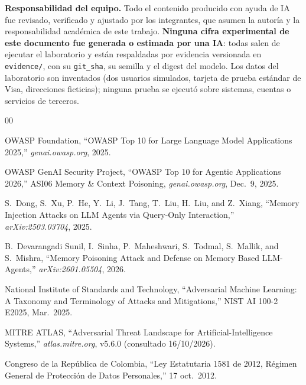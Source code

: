 \documentclass[conference]{IEEEtran}
\begin{document}
\textbf{Responsabilidad del equipo.} Todo el contenido producido con ayuda de
IA fue revisado, verificado y ajustado por los integrantes, que asumen la
autor\'ia y la responsabilidad acad\'emica de este trabajo.
\textbf{Ninguna cifra experimental de este documento fue generada o
estimada por una IA}: todas salen de ejecutar el laboratorio y est\'an
respaldadas por evidencia versionada en \texttt{evidence/}, con su
\texttt{git\_sha}, su semilla y el digest del modelo. Los datos del
laboratorio son inventados (dos usuarios simulados, tarjeta de prueba
est\'andar de Visa, direcciones ficticias); ninguna prueba se ejecut\'o
sobre sistemas, cuentas o servicios de terceros.

\begin{thebibliography}{00}

OWASP Foundation, ``OWASP Top 10 for Large Language Model Applications
2025,'' \emph{genai.owasp.org}, 2025.

OWASP GenAI Security Project, ``OWASP Top 10 for Agentic Applications
2026,'' ASI06 Memory \& Context Poisoning, \emph{genai.owasp.org}, Dec.\ 9,
2025.

S.\ Dong, S.\ Xu, P.\ He, Y.\ Li, J.\ Tang, T.\ Liu, H.\ Liu, and Z.\ Xiang,
``Memory Injection Attacks on LLM Agents via Query-Only Interaction,''
\emph{arXiv:2503.03704}, 2025.

B.\ Devarangadi Sunil, I.\ Sinha, P.\ Maheshwari, S.\ Todmal, S.\ Mallik, and
S.\ Mishra, ``Memory Poisoning Attack and Defense on Memory Based
LLM-Agents,'' \emph{arXiv:2601.05504}, 2026.

National Institute of Standards and Technology, ``Adversarial Machine
Learning: A Taxonomy and Terminology of Attacks and Mitigations,'' NIST AI
100-2 E2025, Mar.\ 2025.

MITRE ATLAS, ``Adversarial Threat Landscape for Artificial-Intelligence
Systems,'' \emph{atlas.mitre.org}, v5.6.0 (consultado 16/10/2026).

Congreso de la Rep\'ublica de Colombia, ``Ley Estatutaria 1581 de 2012,
R\'egimen General de Protecci\'on de Datos Personales,'' 17 oct.\ 2012.

\end{thebibliography}
\end{document}
